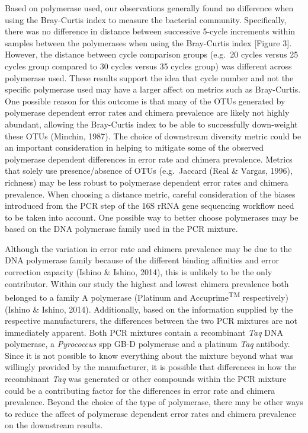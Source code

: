 \documentclass[11pt,]{article}
\begin{document}
Based on polymerase used, our observations generally found no difference
when using the Bray-Curtis index to measure the bacterial community.
Specifically, there was no difference in distance between successive
5-cycle increments within samples between the polymerases when using the
Bray-Curtis index {[}Figure 3{]}. However, the distance between cycle
comparison groups (e.g.~20 cycles versus 25 cycles group compared to 30
cycles versus 35 cycles group) was different across polymerase used.
These results support the idea that cycle number and not the specific
polymerase used may have a larger affect on metrics such as Bray-Curtis.
One possible reason for this outcome is that many of the OTUs generated
by polymerase dependent error rates and chimera prevalence are likely
not highly abundant, allowing the Bray-Curtis index to be able to
successfully down-weight these OTUs (Minchin, 1987). The choice of
downstream diversity metric could be an important consideration in
helping to mitigate some of the observed polymerase dependent
differences in error rate and chimera prevalence. Metrics that solely
use presence/absence of OTUs (e.g.~Jaccard (Real \& Vargas, 1996),
richness) may be less robust to polymerase dependent error rates and
chimera prevalence. When choosing a distance metric, careful
consideration of the biases introduced from the PCR step of the 16S rRNA
gene sequencing workflow need to be taken into account. One possible way
to better choose polymerases may be based on the DNA polymerase family
used in the PCR mixture.

Although the variation in error rate and chimera prevalence may be due
to the DNA polymerase family because of the different binding affinities
and error correction capacity (Ishino \& Ishino, 2014), this is unlikely
to be the only contributor. Within our study the highest and lowest
chimera prevalence both belonged to a family A polymerase (Platinum and
Accuprime\textsuperscript{TM} respectively) (Ishino \& Ishino, 2014).
Additionally, based on the information supplied by the respective
manufacturers, the differences between the two PCR mixtures are not
immediately apparent. Both PCR mixtures contain a recombinant \emph{Taq}
DNA polymerase, a \emph{Pyrococcus} spp GB-D polymerase and a platinum
\emph{Taq} antibody. Since it is not possible to know everything about
the mixture beyond what was willingly provided by the manufacturer, it
is possible that differences in how the recombinant \emph{Taq} was
generated or other compounds within the PCR mixture could be a
contributing factor for the differences in error rate and chimera
prevalence. Beyond the choice of the type of polymerase, there may be
other ways to reduce the affect of polymerase dependent error rates and
chimera prevalence on the downstream results.
\end{document}
